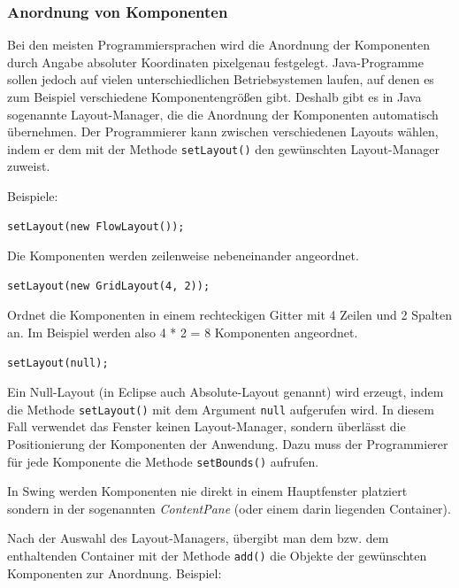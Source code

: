 \subsubsection{Anordnung von Komponenten}

Bei den meisten Programmiersprachen wird die Anordnung der Komponenten durch
Angabe absoluter Koordinaten pixelgenau festgelegt. Java-Programme sollen
jedoch auf vielen unterschiedlichen Betriebsystemen laufen, auf denen es zum
Beispiel verschiedene Komponentengrößen gibt. Deshalb gibt es in Java sogenannte
Layout-Manager, die die Anordnung der Komponenten automatisch übernehmen. Der
Programmierer kann zwischen verschiedenen Layouts wählen, indem er dem
 mit der Methode \lstinline|setLayout()| den gewünschten
Layout-Manager zuweist.

Beispiele:

\begin{compactenum}[a)]
\item
\begin{lstlisting}
setLayout(new FlowLayout());
\end{lstlisting}
Die Komponenten werden zeilenweise nebeneinander angeordnet.

\item
\begin{lstlisting}
setLayout(new GridLayout(4, 2));
\end{lstlisting}
Ordnet die Komponenten in einem rechteckigen Gitter mit 4 Zeilen und 2 Spalten
an. Im Beispiel werden also 4 * 2 = 8 Komponenten angeordnet.

\item
\begin{lstlisting}
setLayout(null);
\end{lstlisting}
Ein Null-Layout (in Eclipse auch Absolute-Layout genannt) wird erzeugt, indem
die Methode \lstinline|setLayout()| mit dem Argument \lstinline|null| aufgerufen
wird. In diesem Fall verwendet das Fenster keinen Layout-Manager, sondern
überlässt die Positionierung der Komponenten der Anwendung. Dazu muss der
Programmierer für jede Komponente die Methode \lstinline|setBounds()| aufrufen.
\end{compactenum}

In Swing werden Komponenten nie direkt in einem Hauptfenster platziert sondern
in der sogenannten \emph{ContentPane} (oder einem darin liegenden Container).

Nach der Auswahl des Layout-Managers, übergibt man dem  bzw. dem
enthaltenden Container mit der Methode \lstinline|add()| die Objekte der
gewünschten Komponenten zur Anordnung. Beispiel:

